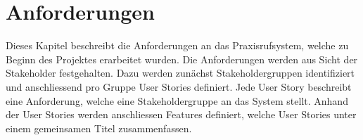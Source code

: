 \section{Anforderungen}\label{sec:anforderungen}

Dieses Kapitel beschreibt die Anforderungen an das Praxisrufsystem, welche zu Beginn des Projektes erarbeitet wurden.
Die Anforderungen werden aus Sicht der Stakeholder festgehalten.
Dazu werden zunächst Stakeholdergruppen identifiziert und anschliessend pro Gruppe User Stories definiert.
Jede User Story beschreibt eine Anforderung, welche eine Stakeholdergruppe an das System stellt.
Anhand der User Stories werden anschliessen Features definiert, welche User Stories unter einem gemeinsamen Titel zusammenfassen.



